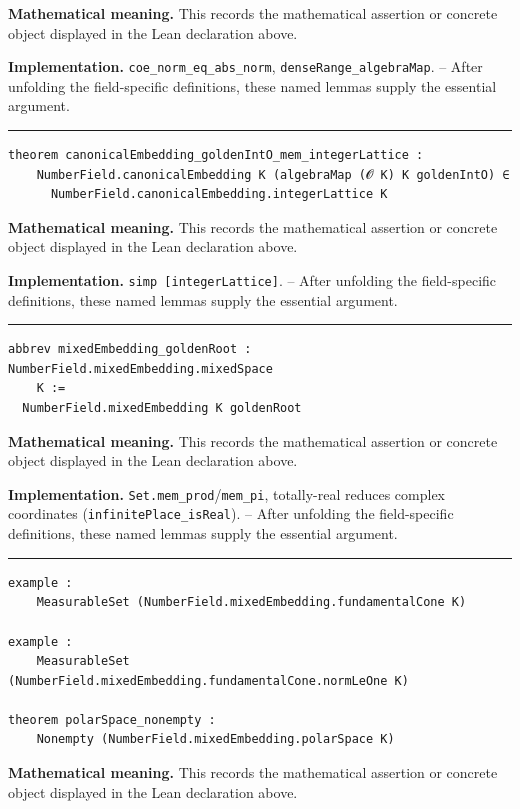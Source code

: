 \documentclass[UTF8,a4paper,11pt,fontset=fandol]{ctexart}
\theoremstyle{definition}
\newcommand{\statementsep}{\par\medskip\hrule\medskip}
\begin{document}
\noindent\textbf{Mathematical meaning.} This records the mathematical assertion or concrete object displayed in the Lean declaration above.\par
\noindent\textbf{Implementation.} \texttt{coe\_\allowbreak{}norm\_\allowbreak{}eq\_\allowbreak{}abs\_\allowbreak{}norm}, \texttt{denseRange\_\allowbreak{}algebraMap}. -- After unfolding the field-specific definitions, these named lemmas supply the essential argument.\par
\statementsep
\begin{verbatim}
theorem canonicalEmbedding_goldenIntO_mem_integerLattice :
    NumberField.canonicalEmbedding K (algebraMap (𝓞 K) K goldenIntO) ∈
      NumberField.canonicalEmbedding.integerLattice K
\end{verbatim}
\noindent\textbf{Mathematical meaning.} This records the mathematical assertion or concrete object displayed in the Lean declaration above.\par
\noindent\textbf{Implementation.} \texttt{simp [integerLattice]}. -- After unfolding the field-specific definitions, these named lemmas supply the essential argument.\par
\statementsep
\begin{verbatim}
abbrev mixedEmbedding_goldenRoot : NumberField.mixedEmbedding.mixedSpace
    K :=
  NumberField.mixedEmbedding K goldenRoot
\end{verbatim}
\noindent\textbf{Mathematical meaning.} This records the mathematical assertion or concrete object displayed in the Lean declaration above.\par
\noindent\textbf{Implementation.} \texttt{Set.\allowbreak{}mem\_\allowbreak{}prod}/\texttt{mem\_\allowbreak{}pi}, totally-real reduces complex coordinates (\texttt{infinitePlace\_\allowbreak{}isReal}). -- After unfolding the field-specific definitions, these named lemmas supply the essential argument.\par
\statementsep
\begin{verbatim}
example :
    MeasurableSet (NumberField.mixedEmbedding.fundamentalCone K)

example :
    MeasurableSet (NumberField.mixedEmbedding.fundamentalCone.normLeOne K)

theorem polarSpace_nonempty :
    Nonempty (NumberField.mixedEmbedding.polarSpace K)
\end{verbatim}
\noindent\textbf{Mathematical meaning.} This records the mathematical assertion or concrete object displayed in the Lean declaration above.\par
\end{document}
